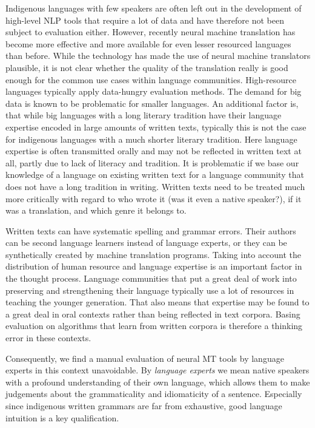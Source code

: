 \documentclass{flammie}
\begin{document}
Indigenous languages with few speakers are often left out in the development of
high-level NLP tools that require a lot of data and have therefore not been
subject to evaluation either.  However, recently neural machine translation has
become more effective and more available for even lesser resourced languages
than before.  While the technology has made the use of neural machine
translators plausible, it is not clear whether the quality of the translation
really is good enough for the common use cases within language communities.
High-resource languages typically apply data-hungry evaluation methods. The
demand for big data is known to be problematic for smaller languages.  An
additional factor is, that while big languages with a long literary tradition
have their language expertise encoded in large amounts of written texts,
typically this is not the case for indigenous languages with a much shorter
literary tradition. Here language expertise is often transmitted orally and may
not be reflected in written text at all, partly due to lack of literacy and
tradition.  It is problematic if we base our knowledge of a language on existing
written text for a language community that does not have a long tradition in
writing.  Written texts need to be treated much more critically with regard to
who wrote it (was it even a native speaker?), if it was a translation, and which
genre it belongs to.

Written texts can  have systematic spelling and grammar errors. Their authors
can be second language learners instead of language experts, or they can be
synthetically created by machine translation programs.  Taking into account the
distribution of human resource and language expertise is an important factor in
the thought process. Language communities that put a great deal of work into
preserving and strengthening their language typically use a lot of resources in
teaching the younger generation. That also means that expertise may be found to
a great deal in oral contexts rather than being reflected in text corpora.
Basing evaluation  on algorithms that learn from written corpora is therefore a
thinking error in these contexts.




Consequently, we find a manual evaluation of neural MT tools by language experts
in this context unavoidable.  By \textit{language experts} we mean native
speakers with a profound understanding of their own language, which allows them
to make judgements about the grammaticality and idiomaticity of a sentence.
Especially since indigenous written grammars are far from exhaustive, good
language intuition is a key qualification.
\end{document}
